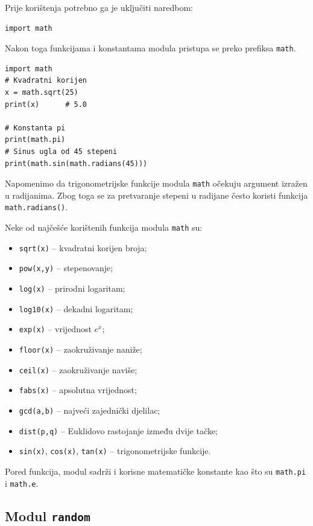 Prije korištenja potrebno ga je uključiti naredbom:

\begin{verbatim}
import math
\end{verbatim}

Nakon toga funkcijama i konstantama modula pristupa se preko prefiksa \texttt{math}.

\begin{verbatim}
import math
# Kvadratni korijen
x = math.sqrt(25)
print(x)      # 5.0

# Konstanta pi
print(math.pi)
# Sinus ugla od 45 stepeni
print(math.sin(math.radians(45)))
\end{verbatim}

Napomenimo da trigonometrijske funkcije modula \texttt{math} očekuju argument izražen u radijanima. Zbog toga se za pretvaranje stepeni u radijane često koristi funkcija \texttt{math.radians()}.

Neke od najčešće korištenih funkcija modula \texttt{math} su:

\begin{itemize}
	\item \texttt{sqrt(x)} -- kvadratni korijen broja;
	\item \texttt{pow(x,y)} -- stepenovanje;
	\item \texttt{log(x)} -- prirodni logaritam;
	\item \texttt{log10(x)} -- dekadni logaritam;
	\item \texttt{exp(x)} -- vrijednost $e^x$;
	\item \texttt{floor(x)} -- zaokruživanje naniže;
	\item \texttt{ceil(x)} -- zaokruživanje naviše;
	\item \texttt{fabs(x)} -- apsolutna vrijednost;
	\item \texttt{gcd(a,b)} -- najveći zajednički djelilac;
	\item \texttt{dist(p,q)} -- Euklidovo rastojanje između dvije tačke;
	\item \texttt{sin(x)}, \texttt{cos(x)}, \texttt{tan(x)} -- trigonometrijske funkcije.
\end{itemize}

Pored funkcija, modul sadrži i korisne matematičke konstante kao što su \texttt{math.pi} i \texttt{math.e}.

\subsection{Modul \texttt{random}}


